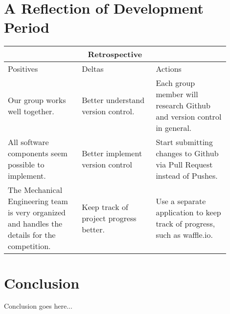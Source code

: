 \documentclass[10pt,letterpaper,onecolumn,draftclsnofoot,journal]{IEEEtran}
\begin{document}
\section{A Reflection of Development Period}
\begin{tabular}{ |p{0.3\linewidth}|p{0.3\linewidth}|p{0.3\linewidth}|  }
\hline
\multicolumn{3}{|c|}{Retrospective} \\
\hline
Positives& Deltas &Actions \\
\hline
Our group works well together. &
Better understand version control.&
Each group member will research Github and version control in general. \\

All software components seem possible to implement. &
Better implement version control &
Start submitting changes to Github via Pull Request instead of Pushes. \\

The Mechanical Engineering team is very organized and handles the details for the competition. &
Keep track of project progress better. & Use a separate application to keep track of progress, such as waffle.io.  \\
\hline
\end{tabular}

\section{Conclusion}
Conclusion goes here...


%
%
\end{document}
